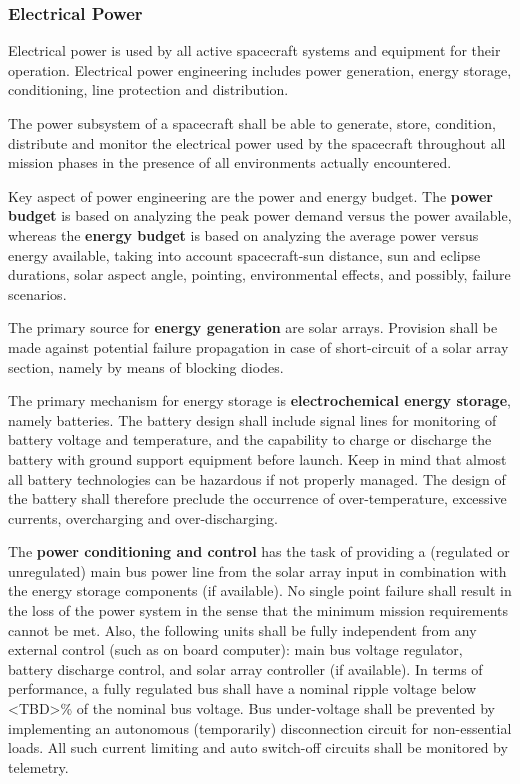 \subsubsection{Electrical Power}

Electrical power is used by all active spacecraft systems and equipment for their operation. Electrical power engineering includes power generation, energy storage,  conditioning, line protection and distribution. 

The power subsystem of a spacecraft shall be able to generate, store, condition, distribute and monitor the electrical power used by the spacecraft throughout all mission phases in the presence of all environments actually encountered.

Key aspect of power engineering are the power and energy budget. The \textbf{power budget} is based on analyzing the peak power demand versus the power available, whereas the \textbf{energy budget} is based on analyzing the average power versus energy available, taking into account spacecraft-sun distance, sun and eclipse durations, solar aspect angle, pointing, environmental effects, and possibly, failure scenarios.

The primary source for \textbf{energy generation} are solar arrays. Provision shall be made against potential failure propagation in case of short-circuit of a solar array section, namely by means of blocking diodes.

The primary mechanism for energy storage is \textbf{electrochemical energy storage}, namely batteries. The battery design shall include signal lines for monitoring of battery voltage and temperature, and the capability to charge or discharge the battery with ground support equipment before launch. Keep in mind that almost all battery technologies can be hazardous if not properly managed. The design of the battery shall therefore preclude the occurrence of over-temperature, excessive currents, overcharging and over-discharging.

The \textbf{power conditioning and control} has the task of providing a (regulated or unregulated) main bus power line from the solar array input in combination with the energy storage components (if available). No single point failure shall result in the loss of the power system in the sense that the minimum mission requirements cannot be met. Also, the following units shall be fully independent from any external control (such as on board computer): main bus voltage regulator, battery discharge control, and solar array controller (if available). In terms of performance, a fully regulated bus shall have a nominal ripple voltage below <TBD>\% of the nominal bus voltage. Bus under-voltage shall be prevented by implementing an autonomous (temporarily) disconnection circuit for non-essential loads. All such current limiting and auto switch-off circuits shall be monitored by telemetry.

